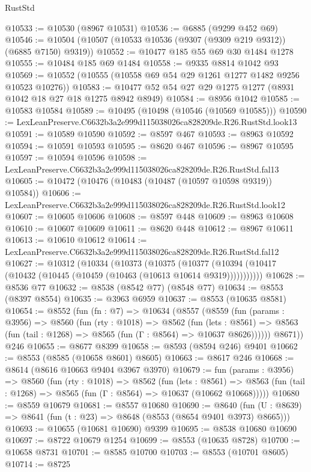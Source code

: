 \begin{lexlean}{RustStd}
\begin{coremodule}
@10533 := @10530 (@8967 @10531)
@10536 := @6885 (@9299 @452 @69)
@10546 := @10504 (@10507 (@10533 @10536 (@9307 (@9309 @219 @9312)) (@6885 @7150) @9319))
@10552 := @10477 @185 @55 @69 @30 @1484 @1278
@10555 := @10484 @185 @69 @1484
@10558 := @9335 @8814 @1042 @93
@10569 := @10552 (@10555 (@10558 @69 @54 @29 @1261 @1277 @1482 @9256 @10523 @10276))
@10583 := @10477 @52 @54 @27 @29 @1275 @1277 (@8931 @1042 @18 @27 @18 @1275 @8942 @8949)
@10584 := @8956 @1042
@10585 := @10583 @10584
@10589 := @10495 (@10498 (@10546 (@10569 @10585)))
@10590 := LexLeanPreserve.C6632b3a2e999d115038026ca828209de.R26.RustStd.look13
@10591 := @10589 @10590
@10592 := @8597 @467
@10593 := @8963 @10592
@10594 := @10591 @10593
@10595 := @8620 @467
@10596 := @8967 @10595
@10597 := @10594 @10596
@10598 := LexLeanPreserve.C6632b3a2e999d115038026ca828209de.R26.RustStd.fal13
@10605 := @10472 (@10476 (@10483 (@10487 (@10597 @10598 @9319)) @10584))
@10606 := LexLeanPreserve.C6632b3a2e999d115038026ca828209de.R26.RustStd.look12
@10607 := @10605 @10606
@10608 := @8597 @448
@10609 := @8963 @10608
@10610 := @10607 @10609
@10611 := @8620 @448
@10612 := @8967 @10611
@10613 := @10610 @10612
@10614 := LexLeanPreserve.C6632b3a2e999d115038026ca828209de.R26.RustStd.fal12
@10627 := @10312
    (@10334
      (@10373
        (@10375
          (@10377 (@10394 (@10417 (@10432 (@10445 (@10459 (@10463 (@10613 @10614 @9319)))))))))))
@10628 := @8536 @77
@10632 := @8538 (@8542 @77) (@8548 @77)
@10634 := @8553 (@8397 @8554)
@10635 := @3963 @6959
@10637 := @8553 (@10635 @8581)
@10654 := @8552
    (fun (fn : @7) =>
    @10634
      (@8557
        (@8559
          (fun (params : @3956) =>
          @8560
            (fun (rty : @1018) =>
            @8562
              (fun (lets : @8561) =>
              @8563 (fun (tail : @1268) => @8565 (fun (Γ : @8564) => @10637 @8626))))))
        @8671))
    @246
@10655 := @8677 @8399
@10658 := @8593 (@8594 @246) @9401
@10662 := @8553 (@8585 (@10658 @8601) @8605)
@10663 := @8617 @246
@10668 := @8614 (@8616 @10663 @9404 @3967 @3970)
@10679 := fun (params : @3956) =>
  @8560
    (fun (rty : @1018) =>
    @8562
      (fun (lets : @8561) =>
      @8563 (fun (tail : @1268) => @8565 (fun (Γ : @8564) => @10637 (@10662 @10668)))))
@10680 := @8559 @10679
@10681 := @8557 @10680
@10690 := @8640
    (fun (U : @8639) => @8641 (fun (t : @23) => @8648 (@8553 (@8654 @9401 @3973) @8665)))
@10693 := @10655 (@10681 @10690) @9399
@10695 := @8538 @10680 @10690
@10697 := @8722 @10679 @1254
@10699 := @8553 (@10635 @8728)
@10700 := @10658 @8731
@10701 := @8585 @10700
@10703 := @8553 (@10701 @8605)
@10714 := @8725

\end{coremodule}
\end{lexlean}
